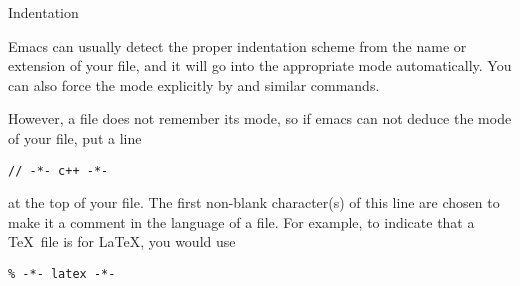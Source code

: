  {Indentation}

Emacs can usually detect the proper indentation scheme from the
name or extension of your file, and it will go into the appropriate
mode automatically. You can also force the mode explicitly by  and similar commands.

However, a file does not remember its mode, so if emacs can not deduce
the mode of your file, put a line
\begin{verbatim}
// -*- c++ -*-
\end{verbatim}
at the top of your file. The first non-blank character(s) of this line
are chosen to make it a comment in the language of a file. For
example, to indicate that a \TeX\ file is for \LaTeX, you would use
\begin{verbatim}
% -*- latex -*-
\end{verbatim}

